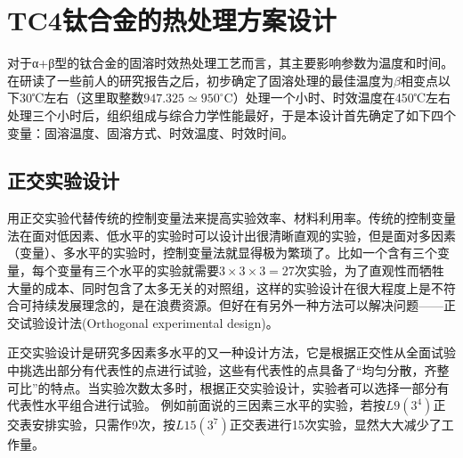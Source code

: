 
\section{TC4钛合金的热处理方案设计}
对于α+β型的\ti 钛合金的固溶时效热处理工艺而言，其主要影响参数为温度和时间。在研读了一些前人的研究报告\cite{mirror1}\cite{ranxingGurongwenduduiTi6Al4VELItaihejinxianweizuzhijixingnengdeyingxiang2021}之后，初步确定了固溶处理的最佳温度为$ \beta $相变点以下30℃左右（这里取整数$ 947.325\simeq950^{\circ} \mathrm{C} $）处理一个小时、时效温度在450℃左右处理三个小时后，组织组成与综合力学性能最好，于是本设计首先确定了如下四个变量：固溶温度、固溶方式、时效温度、时效时间。
\subsection{正交实验设计}
用正交实验代替传统的控制变量法来提高实验效率、材料利用率。传统的控制变量法在面对低因素、低水平的实验时可以设计出很清晰直观的实验，但是面对多因素（变量）、多水平的实验时，控制变量法就显得极为繁琐了。比如一个含有三个变量，每个变量有三个水平的实验就需要$ 3\times 3 \times 3=27$次实验，为了直观性而牺牲大量的成本、同时包含了太多无关的对照组，这样的实验设计在很大程度上是不符合可持续发展理念的，是在浪费资源。但好在有另外一种方法可以解决问题——正交试验设计法(Orthogonal experimental design)。

正交实验设计是研究多因素多水平的又一种设计方法，它是根据正交性从全面试验中挑选出部分有代表性的点进行试验，这些有代表性的点具备了“均匀分散，齐整可比”的特点\cite{wangxueshen}。当实验次数太多时，根据正交实验设计，实验者可以选择一部分有代表性水平组合进行试验。 例如前面说的三因素三水平的实验，若按$ L9(3^4) $正交表安排实验，只需作9次，按$ L15(3^7) $正交表进行15次实验，显然大大减少了工作量。

